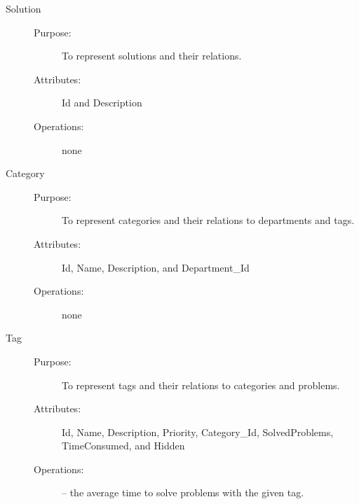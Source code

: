 \begin{description}
\item[Solution]\hfill
\begin{description}
	\item[Purpose:]To represent solutions and their relations.
	\item[Attributes:]Id and Description
	\item[Operations:]none
\end{description}
\end{description}

\begin{description}
\item[Category]\hfill
\begin{description}
	\item[Purpose:]To represent categories and their relations to departments and tags.
	\item[Attributes:]Id, Name, Description, and Department\_Id
	\item[Operations:]none
\end{description}
\end{description}

\begin{description}
\item[Tag]\hfill
\begin{description}
	\item[Purpose:]To represent tags and their relations to categories and problems. 
	\item[Attributes:]Id, Name, Description, Priority, Category\_Id, SolvedProblems, TimeConsumed, and Hidden
	\item[Operations:] -- the average time to solve problems with the given tag.
\end{description}
\end{description}

